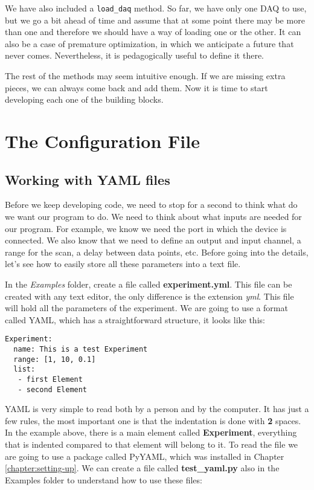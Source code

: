 We have also included a \texttt{load\_daq} method. So far, we have only one DAQ to use, but we go a bit ahead of time and assume that at some point there may be more than one and therefore we should have a way of loading one or the other. It can also be a case of premature optimization, in which we anticipate a future that never comes. Nevertheless, it is pedagogically useful to define it there.

The rest of the methods may seem intuitive enough. If we are missing extra pieces, we can always come back and add them. Now it is time to start developing each one of the building blocks.

\section{The Configuration File}\label{section:configuration-file}
\subsection{Working with YAML files}\label{subsection:yaml-files}
Before we keep developing code, we need to stop for a second to think what do we want our program to do. We need to think about what inputs are needed for our program. For example, we know we need the port in which the device is connected. We also know that we need to define an output and input channel, a range for the scan, a delay between data points, etc. Before going into the details, let's see how to easily store all these parameters into a text file.

In the \emph{Examples} folder, create a file called \textbf{experiment.yml}. This file can be created with any text editor, the only difference is the extension \emph{yml}. This file will hold all the parameters of the experiment. We are going to use a format called {YAML}, which has a straightforward structure, it looks like this:

\begin{verbatim}
Experiment:
  name: This is a test Experiment
  range: [1, 10, 0.1]
  list:
   - first Element
   - second Element
\end{verbatim}

{YAML} is very simple to read both by a person and by the computer. It has just a few rules, the most important one is that the indentation is done with \textbf{2} spaces. In the example above, there is a main element called \textbf{Experiment}, everything that is indented compared to that element will belong to it. To read the file we are going to use a package called PyYAML, which was installed in Chapter \ref{chapter:setting-up}. We can create a file called \textbf{test\_yaml.py} also in the Examples folder to understand how to use these files:

